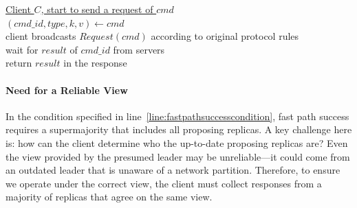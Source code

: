 \documentclass[twocolumn]{article}
\begin{document}
\begin{algorithm}
\caption{Client - Request}
    \label{alg:client_request}
    \setcounter{AlgoLine}{0}
    
    \underline{Client $C$, start to send a request of $cmd$}\\

    $(cmd\_id, type, k, v)\gets cmd$\\
     {
        client broadcasts $Request(cmd)$ according to original protocol rules\\
        wait for $result$ of $cmd\_id$ from servers\\
        return $result$ in the response\\
    }
\end{algorithm}

\paragraph{Need for a Reliable View} 
In the condition specified in line~\ref{line:fastpathsuccesscondition}, fast path success requires a supermajority that includes all proposing replicas. A key challenge here is: how can the client determine who the up-to-date proposing replicas are? Even the view provided by the presumed leader may be unreliable—it could come from an outdated leader that is unaware of a network partition. Therefore, to ensure we operate under the correct view, the client must collect responses from a majority of replicas that agree on the same view.
\end{document}
